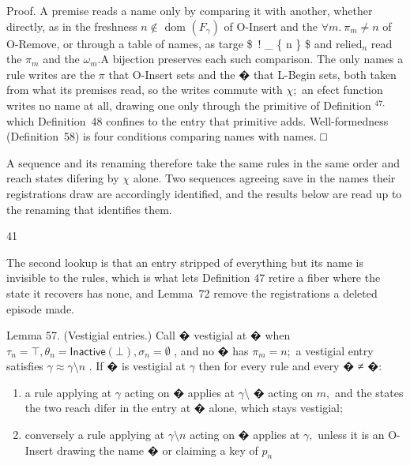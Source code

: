 \documentclass[
  10
]{article}
\newcounter{none} %
\begin{document}
Proof. A premise reads a name only by comparing it with another, whether
directly, as in the freshness \(n \not \in\) dom
\(\left( F _ { \gamma } \right)\) of O-Insert and the
\(\forall m . \ \pi _ { m } \neq n\) of O-Remove, or through a table of
names, as targe \$~!  \_ \{ n \} \$ and
\(\mathrm { r e l i e d } _ { n }\) read the \(\pi _ { m }\) and the
\(\omega _ { m } . \mathrm { A }\) bijection preserves each such
comparison. The only names a rule writes are the \(\pi\) that O-Insert
sets and the � that L-Begin sets, both taken from what its premises
read, so the writes commute with \(\chi ;\) an efect function writes no
name at all, drawing one only through the primitive of Definition
\(^ { 4 7 , }\) which Definition~48 confines to the entry that primitive
adds. Well-formedness (Definition~58) is four conditions comparing names
with names. □

A sequence and its renaming therefore take the same rules in the same
order and reach states difering by \(\chi\) alone. Two sequences
agreeing save in the names their registrations draw are accordingly
identified, and the results below are read up to the renaming that
identifies them.

41

The second lookup is that an entry stripped of everything but its name
is invisible to the rules, which is what lets Definition \(4 7\) retire
a fiber where the state it recovers has none, and Lemma~72 remove the
registrations a deleted episode made.

Lemma 57. (Vestigial entries.) Call � vestigial at � when
\(\tau _ { n } = \top , \theta _ { n } = \mathsf { I n a c t i v e ( \bot ) } , \sigma _ { n } = \emptyset\)
, and no � has \(\pi _ { m } = n ;\) a vestigial entry satisfies
\(\gamma \approx \gamma \setminus n\) . If � is vestigial at \(\gamma\)
then for every rule and every � ≠ �:

\begin{enumerate}
\def\labelenumi{\arabic{enumi}.}
\item
  a rule applying at \(\gamma\) acting on � applies at
  \(\gamma \setminus\) � acting on \(m ,\) and the states the two reach
  difer in the entry at � alone, which stays vestigial;
\item
  conversely a rule applying at \(\gamma \setminus n\) acting on �
  applies at \(\gamma ,\) unless it is an O-Insert drawing the name � or
  claiming a key of \(p _ { n }\)
\end{enumerate}
\end{document}
